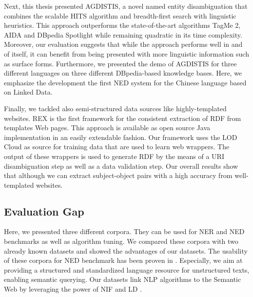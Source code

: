 Next, this thesis presented AGDISTIS, a novel named entity disambiguation that combines the scalable \ac{HITS} algorithm and breadth-first search with linguistic heuristics.
This approach outperforms the state-of-the-art algorithms TagMe 2, AIDA and DBpedia Spotlight while remaining quadratic in its time complexity. 
Moreover, our evaluation suggests that while the approach performs well in and of itself, it can benefit from being presented with more linguistic information such as surface forms. 
Furthermore, we presented the demo of AGDISTIS for three different languages on three different DBpedia-based knowledge bases.
Here,  we emphasize the development the first \ac{NED} system for the Chinese language based on Linked Data.

Finally, we tackled also semi-structured data sources like highly-templated websites. 
REX is the first framework for the consistent extraction of \ac{RDF} from templates Web pages. 
This approach is available as open source Java implementation in an easily extendable fashion.
Our framework uses the \ac{LOD} Cloud as source for training data that are used to learn web wrappers. 
The output of these wrappers is used to generate \ac{RDF} by the means of a URI disambiguation step as well as a data validation step.
Our overall results show that although we can extract subject-object pairs with a high accuracy from well-templated websites.


\subsection*{Evaluation Gap}
Here, we presented three different corpora.
They can be used for \ac{NER}  and \ac{NED}  benchmarks as well as algorithm tuning.
We compared these corpora with two already known datasets and showed the advantages of our datasets.
The usability of these corpora for \ac{NED}  benchmark has been proven in \cite{agdistis_iswc,GER+13}.
Especially, we aim at providing a structured and standardized language resource for unstructured texts, enabling semantic querying.
Our datasets link \ac{NLP}  algorithms to the Semantic Web by leveraging the power of NIF and \ac{LD} .


